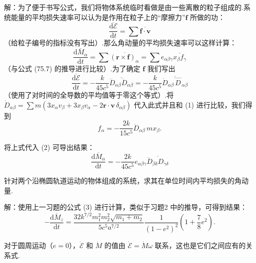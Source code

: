 \begin{xiti}
解：为了便于书写公式，我们将物体系统临时看做是由一些离散的粒子组成的.系统能量的平均损失速率可以认为是作用在粒子上的“摩擦力”$\boldsymbol{f}$ 所做的功：
\begin{equation}
  \frac{\overline{\mathrm{d}\mathcal{E}}}{\mathrm{d}t}
  =\sum\overline{\boldsymbol{f}\cdot\boldsymbol{v}}
  \tag{1}
\end{equation}
（给粒子编号的指标没有写出）.那么角动量的平均损失速率可以这样计算：
\begin{equation}
  \overline{\frac{\mathrm{d}M_{\alpha}}{\mathrm{d}t}}
  =\sum\overline{(\boldsymbol{r}\times\boldsymbol{f})_{\alpha}}
  =\sum e_{\alpha\beta\gamma}\overline{x_{\beta}f_{\gamma}}
  \tag{2}
\end{equation}
（与公式 (75.7) 的推导进行比较）.为了确定 $\boldsymbol{f}$ 我们写出
\begin{equation*}
  \frac{\overline{\mathrm{d}\mathcal{E}}}{\mathrm{d}t}
  =-\frac{k}{45c^{5}}\overline{\dddot{D}_{\alpha\beta}
  \dddot{D}_{\alpha\beta}}
  =-\frac{k}{45c^{5}}\overline{\dot{D}_{\alpha\beta}
  \overset{\cdots\cdots}{D}_{\alpha\beta}}
\end{equation*}
（使用了对时间的全导数的平均值等于零这个等式）.将
$\dot{D}_{\alpha\beta}=\sum m(3x_{\alpha}v_{\beta}
+3x_{\beta}v_{\alpha}-2\boldsymbol{r}\cdot\boldsymbol{v}\,\delta_{\alpha\beta})$
代入此式并且和 (1) 进行比较，我们得到
\begin{equation*}
  f_{\alpha}=-\frac{2k}{15c^{5}}\ddot{D}_{\alpha\beta}\,mx_{\beta}.
\end{equation*}

将上式代入 (2) 可导出结果：
\begin{equation}
  \overline{\frac{\mathrm{d}M_{\alpha}}{\mathrm{d}t}}
  =-\frac{2k}{45c^{5}}e_{\alpha\beta\gamma}
  \overline{\dddot{D}_{\beta\delta}D_{\gamma\delta}}
  \tag{3}
\end{equation}

\quad 针对两个沿椭圆轨道运动的物体组成的系统，求其在单位时间内平均损失的角动量.

解：使用上一习题的公式 (3) 进行计算，类似于习题2 中的推导，可得到结果：
\begin{equation*}
  -\frac{\overline{\mathrm{d}M_z}}{\mathrm{d}t}
  =\frac{32k^{7/2}m_1^{2}m_2^{2}\sqrt{m_1+m_2}}{5c^{5}a^{7/2}}
  \frac{1}{(1-e^{2})^{2}}
  \left(1+\frac{7}{8}e^{2}\right).
\end{equation*}

对于圆周运动（$e=0$），$\dot{\mathcal{E}}$ 和 $\dot{M}$ 的值由 $\dot{\mathcal{E}}=\dot{M}\omega$ 联系，这也是它们之间应有的关系式.

\end{xiti}
